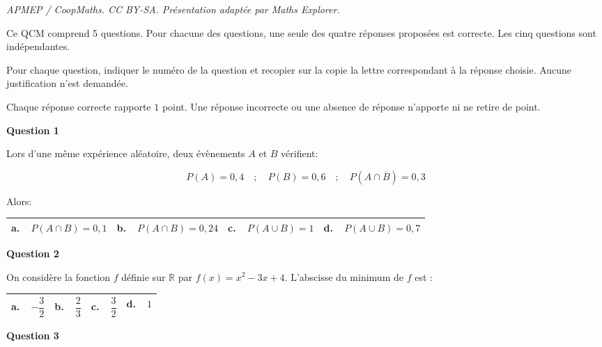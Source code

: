 \documentclass[10pt]{article}
\providecommand{\R}{\mathbb{R}}
\begin{document}
\noindent\textit{APMEP / CoopMaths. CC BY-SA. Présentation adaptée par Maths Explorer.}\par\medskip
\medskip

Ce QCM comprend 5 questions. Pour chacune des questions, une seule des quatre réponses proposées est correcte. Les cinq questions sont indépendantes.

Pour chaque question, indiquer le numéro de la question et recopier sur la copie la lettre correspondant à la réponse choisie. Aucune justification n'est demandée.

Chaque réponse correcte rapporte $1$ point. Une réponse incorrecte ou une absence de réponse n'apporte ni ne retire de point.

\medskip

\textbf{Question 1}

\medskip

Lors d'une même expérience aléatoire, deux évènements $A$ et $B$ vérifient:

\[P(A) = 0,4\quad ;\quad P(B) = 0,6\quad ;\quad  P\left( A \cap \overline{B}\right )= 0,3\]

Alors:

\begin{center}
\begin{tabularx}{\linewidth}{|*{4}{X|}}\hline
\textbf{a.~~}$P(A \cap B)= 0,1$&\textbf{b.~~}$P(A \cap B)= 0,24$&\textbf{c.~~}$P(A \cup B)=1$&\textbf{d.~~}$P(A \cup B)= 0,7$\\ \hline
\end{tabularx}
\end{center}

\medskip

\textbf{Question 2}

\medskip

On considère la fonction $f$ définie sur $\R$ par $f(x) = x^2 - 3x + 4$. L'abscisse du minimum de $f$ est :

\begin{center}
\begin{tabularx}{\linewidth}{|*{4}{X|}}\hline
\textbf{a.~~}$-\dfrac{3}{2}$&\textbf{b.~~}$\dfrac{2}{3}$&\textbf{c.~~}$\dfrac{3}{2}$&\textbf{d.~~}$1$\rule[-3mm]{0mm}{8mm}\\ \hline
\end{tabularx}
\end{center}

\medskip

\textbf{Question 3}

\medskip
\end{document}
